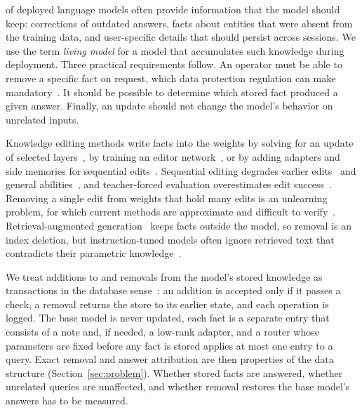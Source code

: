 \documentclass[journal,10pt]{IEEEtran}
\begin{document}
 of deployed language models often provide information that the
model should keep: corrections of outdated answers, facts about entities that were
absent from the training data, and user-specific details that should persist across
sessions. We use the term \emph{living model} for a model that accumulates such
knowledge during deployment. Three practical requirements follow. An operator must be
able to remove a specific fact on request, which data protection regulation can make
mandatory~\cite{gdpr2016}. It should be possible to determine which stored fact produced
a given answer. Finally, an update should not change the model's behavior on unrelated
inputs.

Knowledge editing methods write facts into the weights by solving for an update of
selected layers~\cite{meng2022rome,meng2023memit,fang2025alphaedit}, by training an
editor network~\cite{decao2021editing,mitchell2022mend}, or by adding adapters and side
memories for sequential edits~\cite{huang2023tpatcher,hartvigsen2023grace,wang2024wise}.
Sequential editing degrades earlier edits~\cite{gupta2024forgetting} and general
abilities~\cite{gu2024harms}, and teacher-forced evaluation overestimates edit
success~\cite{yang2025mirage}. Removing a single edit from weights that hold many edits
is an unlearning problem, for which current methods are approximate and difficult to
verify~\cite{eldan2023harrypotter,maini2024tofu,shi2025muse,liu2025rethinking}.
Retrieval-augmented generation~\cite{lewis2020rag} keeps facts outside the model, so
removal is an index deletion, but instruction-tuned models often ignore retrieved text
that contradicts their parametric knowledge~\cite{longpre2021conflicts,xie2024chameleon}.

We treat additions to and removals from the model's stored knowledge as transactions in
the database sense~\cite{haerder1983transactions}: an addition is accepted only if it
passes a check, a removal returns the store to its earlier state, and each operation is
logged. The base model is never updated, each fact is a separate entry that consists of
a note and, if needed, a low-rank adapter, and a router whose parameters are fixed
before any fact is stored applies at most one entry to a query. Exact removal and answer attribution are then
properties of the data structure (Section~\ref{sec:problem}). Whether stored facts are
answered, whether unrelated queries are unaffected, and whether removal restores the base
model's answers has to be measured.
\end{document}

